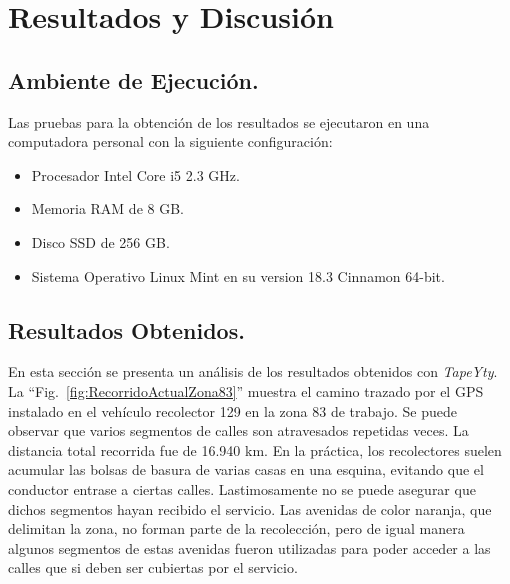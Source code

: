 \chapter{Resultados y Discusión}
\label{resultadosdiscusion}
\ifpdf
  \graphicspath{{Chapter6/Chapter6Figs/PNG/}{Chapter6/Chapter6Figs/PDF/}{Chapter6/Chapter6Figs/}}
\else
  \graphicspath{{Chapter6/Chapter6Figs/EPS/}{Chapter6/Chapter6Figs/}}
\fi


\section{Ambiente de Ejecución.}

Las pruebas para la obtención de los resultados se ejecutaron en una computadora personal con la siguiente configuración:
\begin{itemize}
   \item Procesador Intel\textcopyright{}  Core\texttrademark{} i5 2.3 GHz.
    \item Memoria RAM de 8 GB. 
    \item Disco SSD de 256 GB.
    \item Sistema Operativo Linux Mint en su version 18.3 Cinnamon 64-bit.
\end{itemize}



\section{Resultados Obtenidos.}

En esta sección se presenta un análisis de los resultados obtenidos con \textit{TapeYty}.
La ``Fig.~\ref{fig:RecorridoActualZona83}'' muestra el camino trazado por el GPS instalado en el vehículo recolector 129 en la zona 83 de trabajo. Se puede observar que varios segmentos de calles son atravesados repetidas veces. La distancia total recorrida fue de 16.940 km. En la práctica, los recolectores suelen acumular las bolsas de basura de varias casas en una esquina, evitando que el conductor entrase a ciertas calles. Lastimosamente no se puede asegurar que dichos segmentos hayan recibido el servicio. Las avenidas de color naranja, que delimitan la zona, no forman parte de la recolección, pero de igual manera algunos segmentos de estas avenidas fueron utilizadas para poder acceder a las calles que si deben ser cubiertas por el servicio.

